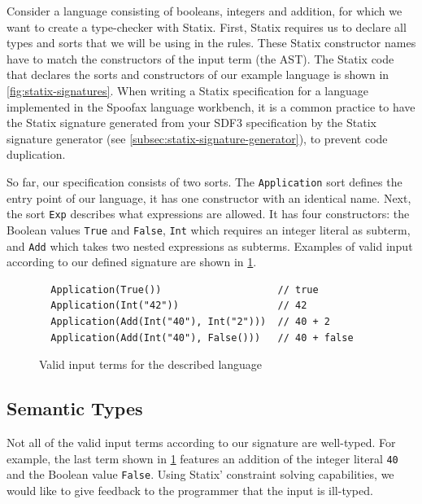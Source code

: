       Consider a language consisting of booleans, integers and addition, for which we want to create a type-checker with Statix. First, Statix requires us to declare all types and sorts that we will be using in the rules. These Statix constructor names have to match the constructors of the input term (the AST). The Statix code that declares the sorts and constructors of our example language is shown in \cref{fig:statix-signatures}. When writing a Statix specification for a language implemented in the Spoofax language workbench, it is a common practice to have the Statix signature generated from your SDF3 specification by the Statix signature generator (see \cref{subsec:statix-signature-generator}), to prevent code duplication.

      So far, our specification consists of two sorts. The \texttt{Application} sort defines the entry point of our language, it has one constructor with an identical name. Next, the sort \texttt{Exp} describes what expressions are allowed. It has four constructors: the Boolean values \texttt{True} and \texttt{False}, \texttt{Int} which requires an integer literal as subterm, and \texttt{Add} which takes two nested expressions as subterms. Examples of valid input according to our defined signature are shown in \cref{fig:statix-valid-input}.

      \begin{figure}[H]
        \begin{verbatim}
  Application(True())                    // true
  Application(Int("42"))                 // 42
  Application(Add(Int("40"), Int("2")))  // 40 + 2
  Application(Add(Int("40"), False()))   // 40 + false
        \end{verbatim}
        \caption{\label{fig:statix-valid-input}Valid input terms for the described language}
      \end{figure}

    \subsection{Semantic Types}

      Not all of the valid input terms according to our signature are well-typed. For example, the last term shown in \cref{fig:statix-valid-input} features an addition of the integer literal \texttt{40} and the Boolean value \texttt{False}. Using Statix' constraint solving capabilities, we would like to give feedback to the programmer that the input is ill-typed.


